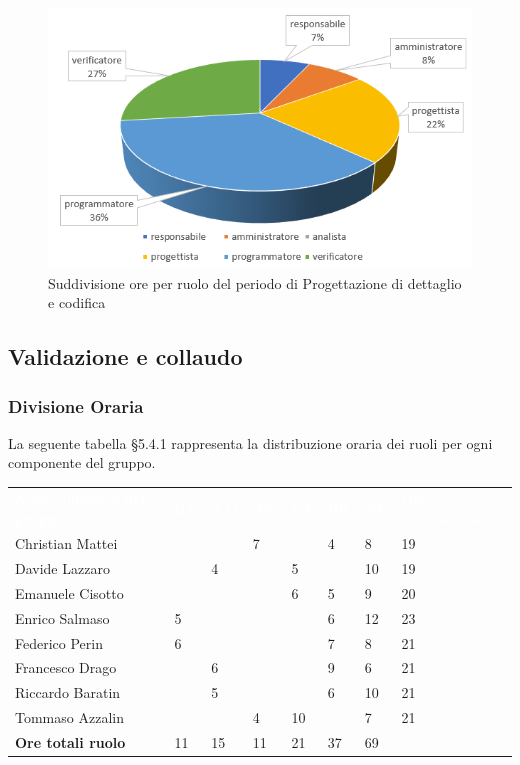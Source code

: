 \begin{figure}[h]
	\centering
	\includegraphics[scale=2]{sezioni/Aerogrammi/AerogrammaDiDettaglio.png}
	\caption{Suddivisione ore per ruolo del periodo di Progettazione di dettaglio e codifica}
\end{figure}

\subsection{Validazione e collaudo}

\subsubsection{Divisione Oraria}
La seguente tabella §5.4.1 rappresenta la distribuzione oraria dei ruoli per ogni componente del gruppo.
{
	\renewcommand{\arraystretch}{2}
	\centering
	\begin{longtable}{ C{5cm} C{1cm} C{1cm} C{1cm} C{1cm} C{1cm} C{1cm} C{3cm}}
		\textcolor{white}{\textbf{Nome membro del gruppo}} & \textcolor{white}{\textbf{RE}} & \textcolor{white}{\textbf{AM}} & \textcolor{white}{\textbf{AN}} & \textcolor{white}{\textbf{PT}} & \textcolor{white}{\textbf{PR}} & \textcolor{white}{\textbf{VE}} & \textcolor{white}{\textbf{Ore complessive}}\\	
        
        Christian Mattei & & & 7 & & 4 & 8 & 19\\
        Davide Lazzaro & & 4 & & 5 & & 10 & 19\\
        Emanuele Cisotto & & & & 6 & 5 & 9 & 20 \\
        Enrico Salmaso & 5 & & & & 6 & 12 & 23\\
        Federico Perin & 6 & & & & 7 & 8 & 21\\
        Francesco Drago & & 6 & & & 9 & 6 & 21\\
        Riccardo Baratin & & 5 & & & 6 & 10 & 21\\
        Tommaso Azzalin & & & 4 & 10 & & 7 & 21\\
        \textbf{Ore totali ruolo} & 11 & 15 & 11 & 21 & 37 & 69 & \\
		
	\end{longtable}
}


